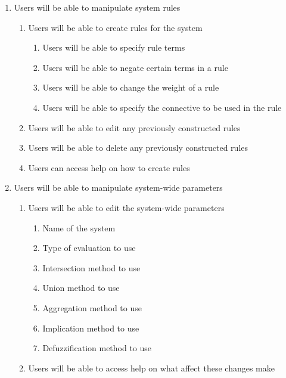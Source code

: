 \begin{enumerate}
\item Users will be able to manipulate system rules
	\begin{enumerate}[label*=\arabic*.]
		\item Users will be able to create rules for the system
		\begin{enumerate}[label*=\arabic*.]
			\item Users will be able to specify rule terms
			\item Users will be able to negate certain terms in a rule
			\item Users will be able to change the weight of a rule
			\item Users will be able to specify the connective to be used in the rule
		\end{enumerate}
		\item Users will be able to edit any previously constructed rules
		\item Users will be able to delete any previously constructed rules
		\item Users can access help on how to create rules
	\end{enumerate}		

\item Users will be able to manipulate system-wide parameters
	\begin{enumerate}[label*=\arabic*.]
		\item Users will be able to edit the system-wide parameters
		\begin{enumerate}[label*=\arabic*.]
			\item Name of the system
			\item Type of evaluation to use
			\item Intersection method to use
			\item Union method to use
			\item Aggregation method to use
			\item Implication method to use
			\item Defuzzification method to use		
		\end{enumerate}
		\item Users will be able to access help on what affect these changes make
	\end{enumerate}


\end{enumerate}
